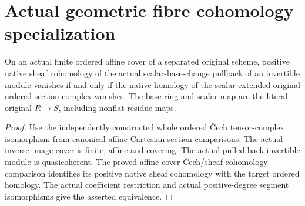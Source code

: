 \section{Actual geometric fibre cohomology specialization}

\begin{lemma}
\label{lem:kn-derived-geometric-fibre-cohomology}
\leanok
On an actual finite ordered affine cover of a separated original
scheme, positive native sheaf cohomology of the actual scalar-base-change
pullback of an invertible module vanishes if and only if the native
homology of the scalar-extended original ordered section complex
vanishes.  The base ring and scalar map are the literal original
$R\to S$, including nonflat residue maps.
\end{lemma}
\begin{proof}
Use the independently constructed whole ordered \v{C}ech tensor-complex
isomorphism from canonical affine Cartesian section comparisons.
The actual inverse-image cover is finite, affine and covering.
The actual pulled-back invertible module is quasicoherent.  The
proved affine-cover \v{C}ech/sheaf-cohomology comparison identifies
its positive native sheaf cohomology with the target ordered
homology.  The actual coefficient restriction and actual
positive-degree segment isomorphisms give the asserted equivalence.
\end{proof}

